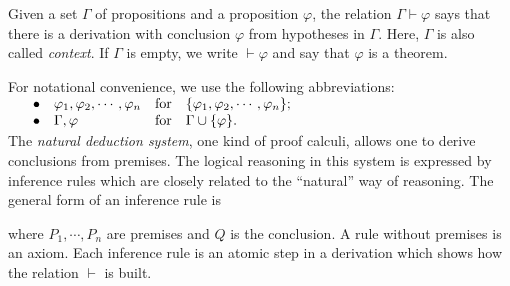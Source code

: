 Given a set $ \Gamma $ of propositions and a proposition $ \varphi $, the relation $ \Gamma \vdash \varphi $ says that there is a derivation with conclusion $ \varphi $ from hypotheses in $ \Gamma $. Here, $ \Gamma $ is also called \emph{context}. If $ \Gamma $ is empty, we write $ \vdash \varphi $ and say that $ \varphi $ is a theorem.

For notational convenience, we use the following abbreviations:\\
$
\begin{array}{rlll}
\hspace*{12pt} \bullet & \varphi _1 , \varphi _2 , \cdots , \varphi _n & \text{for} & \{ \varphi _1 , \varphi _2 , \cdots , \varphi _n \} ; \\
\bullet & \Gamma , \varphi & \text{for} & \Gamma \cup \{ \varphi \} .
\end{array}
$
\\
The \emph{natural deduction system}, one kind of proof calculi, allows one to derive conclusions from premises. The logical reasoning in this system is expressed by inference rules which are closely related to the ``natural'' way of reasoning. The general form of an inference rule is
\begin{prooftree}
\end{prooftree}
where $ P_1 , \cdots , P_n $ are premises and $ Q $ is the conclusion. A rule without premises is an axiom. Each inference rule is an atomic step in a derivation which shows how the relation $ \vdash $ is built.

